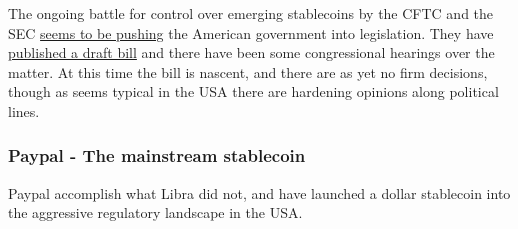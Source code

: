 The ongoing battle for control over emerging stablecoins by the CFTC and the SEC \href{
https://www.reuters.com/legal/transactional/presidents-working-group-report-calls-stablecoin-regulation-2021-12-02/}{seems to be pushing} the American government into legislation. They have \href{https://docs.house.gov/meetings/BA/BA21/20230419/115753/BILLS-118pih-Toproviderequirementsforpaymentstablecoinissuersresearchonadigitaldollarandforotherpurposes.pdf}{published a draft bill} and there have been some congressional hearings over the matter. At this time the bill is nascent, and there are as yet no firm decisions, though as seems typical in the USA there are hardening opinions along political lines.
\begin{itemize}
  




\subsubsection{Paypal - The mainstream stablecoin}
Paypal accomplish what Libra did not, and have launched a dollar stablecoin into the aggressive regulatory landscape in the USA.


\end{itemize}
